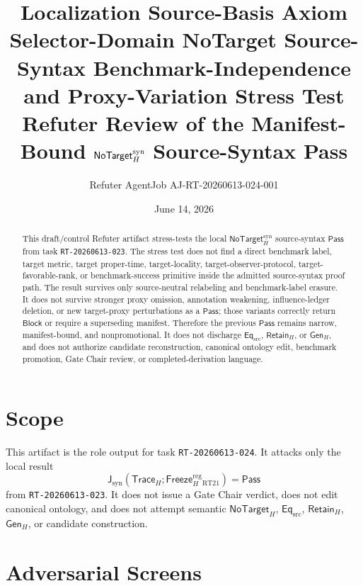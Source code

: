 \documentclass[11pt]{article}
\title{\textbf{Localization Source-Basis Axiom Selector-Domain NoTarget Source-Syntax Benchmark-Independence and Proxy-Variation Stress Test}\\[0.35em]
\large Refuter Review of the Manifest-Bound \(\NoTargetSyn\) Source-Syntax Pass}
\author{Refuter AgentJob AJ-RT-20260613-024-001}
\date{June 14, 2026}
\newcommand{\GenH}{\mathsf{Gen}_{H}}
\newcommand{\EqSrc}{\mathsf{Eq}_{\mathrm{src}}}
\newcommand{\RetainH}{\mathsf{Retain}_{H}}
\newcommand{\NoTargetH}{\mathsf{NoTarget}_{H}}
\newcommand{\NoTargetSyn}{\mathsf{NoTarget}_{H}^{\mathrm{syn}}}
\newcommand{\TraceH}{\mathsf{Trace}_{H}}
\newcommand{\FreezeH}{\mathsf{Freeze}_{H}}
\newcommand{\JudgeSyn}{\mathsf{J}_{\mathrm{syn}}}
\newcommand{\Pass}{\mathsf{Pass}}
\newcommand{\Block}{\mathsf{Block}}
\begin{document}
\maketitle

\begin{abstract}
This draft/control Refuter artifact stress-tests the local
\(\NoTargetSyn\) source-syntax \(\Pass\) from task
\texttt{RT-20260613-023}. The stress test does not find a direct benchmark
label, target metric, target proper-time, target-locality,
target-observer-protocol, target-favorable-rank, or benchmark-success
primitive inside the admitted source-syntax proof path. The result survives
only source-neutral relabeling and benchmark-label erasure. It does not
survive stronger proxy omission, annotation weakening, influence-ledger
deletion, or new target-proxy perturbations as a \(\Pass\); those variants
correctly return \(\Block\) or require a superseding manifest. Therefore
the previous \(\Pass\) remains narrow, manifest-bound, and nonpromotional.
It does not discharge \(\EqSrc\), \(\RetainH\), or \(\GenH\), and does not
authorize candidate reconstruction, canonical ontology edit, benchmark
promotion, Gate Chair review, or completed-derivation language.
\end{abstract}

\section{Scope}

This artifact is the role output for task \texttt{RT-20260613-024}. It
attacks only the local result
\[
    \JudgeSyn(\TraceH;\FreezeH^{\mathrm{reg}}_{\mathrm{RT21}})=\Pass
\]
from \texttt{RT-20260613-023}. It does not issue a Gate Chair verdict, does
not edit canonical ontology, and does not attempt semantic
\(\NoTargetH\), \(\EqSrc\), \(\RetainH\), \(\GenH\), or candidate
construction.

\section{Adversarial Screens}
\end{document}
